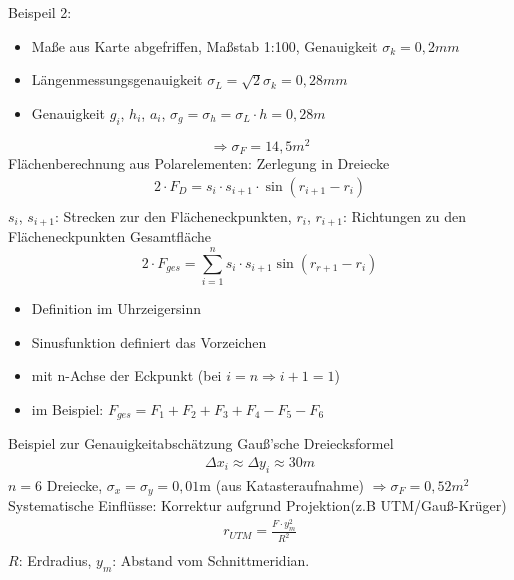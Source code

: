 \documentclass[12pt]{article}
\begin{document}
Beispeil 2:
\begin{itemize}
	\item Maße aus Karte abgefriffen, Maßstab 1:100, Genauigkeit $\sigma_k = 0,2mm$
	\item Längenmessungsgenauigkeit $\sigma_L = \sqrt{2} \sigma_k = 0,28mm$
	\item Genauigkeit $g_i$, $h_i$, $a_i$, $\sigma_g = \sigma_h = \sigma_L \cdot h = 0,28m$
\end{itemize}
\begin{equation*}
	\Longrightarrow \sigma_F = 14,5m^2
\end{equation*}
Flächenberechnung aus Polarelementen: \newline
Zerlegung in Dreiecke
\begin{gather*}
	2 \cdot F_D = s_i \cdot s_{i+1} \cdot \sin(r_{i+1} - r_i) \\
\end{gather*}
$s_i$, $s_{i+1}$: Strecken zur den Flächeneckpunkten, $r_i$, $r_{i+1}$: Richtungen zu den Flächeneckpunkten\newline
Gesamtfläche
\begin{equation*}
	2 \cdot F_{ges} = \sum_{i=1}^{n} s_i\cdot s_{i+1} \sin(r_{r+1} - r_i)
\end{equation*}
\begin{itemize}
	\item Definition im Uhrzeigersinn
	\item Sinusfunktion definiert das Vorzeichen
	\item mit n-Achse der Eckpunkt (bei $i=n \Rightarrow i+1 =1$)
	\item im Beispiel: $F_{ges} = F_1 + F_2 + F_3 + F_4 - F_5 - F_6$
\end{itemize}
Beispiel zur Genauigkeitabschätzung \newline
Gauß'sche Dreiecksformel
\begin{gather*}
	\Delta x_i \approx \Delta y_i \approx 30m
\end{gather*}
$n=6$ Dreiecke, $\sigma_x = \sigma_y = 0,01$m (aus Katasteraufnahme) $\Rightarrow \sigma_F = 0,52 m^2$ \newline
Systematische Einflüsse: \newline
Korrektur aufgrund Projektion(z.B UTM/Gauß-Krüger)
\begin{gather*}
	r_{UTM} = \frac{F \cdot y_m^2}{R^2} \\
\end{gather*}
$R$: Erdradius, $y_m$: Abstand vom Schnittmeridian. \newline
\end{document}
